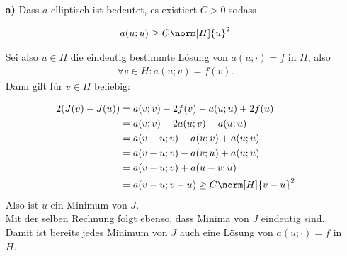 \begin{solution}
\phantom{}
\begin{itemize}
  \item[\textbf{a)}]
  Dass $a$ elliptisch ist bedeutet, es existiert $C > 0$ sodass

  \begin{align*}
    a(u;u) \geq C \norm[H]{u}^2
  \end{align*}

  Sei also $u \in H$ die eindeutig bestimmte Lösung von $a(u;\cdot) = f$ in $H$, also
  \begin{align*}
    \forall v \in H: a(u;v) = f(v).
  \end{align*}
  Dann gilt für $v \in H$ beliebig:

  \begin{align*}
    2(J(v) - J(u)) &=
     a(v;v) - 2f(v) - a(u;u) + 2f(u) \\
     &=
     a(v;v) -2a(u;v) + a(u;u) \\
     &=
     a(v-u;v) - a(u;v) + a(u;u) \\
     &=
     a(v-u;v) - a(v;u) + a(u;u) \\
     &=
     a(v-u;v) + a(u-v;u) \\
     &=
     a(v-u;v-u)
     \geq
     C \norm[H]{v-u}^2
  \end{align*}
  Also ist $u$ ein Minimum von $J$. \\
  Mit der selben Rechnung folgt ebenso, dass Minima von $J$ eindeutig sind.
  Damit ist bereits jedes Minimum von $J$ auch eine Lösung von $a(u;\cdot) = f$ in $H$.


\end{itemize}
\end{solution}
